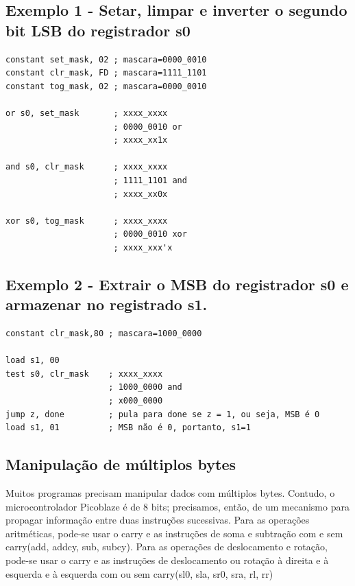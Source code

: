 \documentclass{article}
\begin{document}
\subsection{Exemplo 1 - Setar, limpar e inverter o segundo bit LSB do registrador s0}
\begin{boxedd}
\begin{lstlisting}
constant set_mask, 02 ; mascara=0000_0010
constant clr_mask, FD ; mascara=1111_1101
constant tog_mask, 02 ; mascara=0000_0010
 
or s0, set_mask       ; xxxx_xxxx
                      ; 0000_0010 or
                      ; xxxx_xx1x

and s0, clr_mask      ; xxxx_xxxx
                      ; 1111_1101 and
                      ; xxxx_xx0x 

xor s0, tog_mask      ; xxxx_xxxx 
                      ; 0000_0010 xor 
                      ; xxxx_xxx'x
\end{lstlisting}
\end{boxedd}
\subsection{Exemplo 2 - Extrair o MSB do registrador s0 e armazenar no registrado s1.}
\begin{boxedd}
\begin{lstlisting}
constant clr_mask,80 ; mascara=1000_0000

load s1, 00
test s0, clr_mask    ; xxxx_xxxx
                     ; 1000_0000 and
                     ; x000_0000
jump z, done         ; pula para done se z = 1, ou seja, MSB é 0
load s1, 01          ; MSB não é 0, portanto, s1=1          
\end{lstlisting}
\end{boxedd}
\subsection{Manipulação de múltiplos bytes}
Muitos programas precisam manipular dados com múltiplos bytes. Contudo, o microcontrolador Picoblaze é de 8 bits; precisamos, então, de um mecanismo para propagar informação entre duas instruções sucessivas.
  Para as operações aritméticas, pode-se usar o carry e as instruções de soma e subtração com e sem carry(add, addcy, sub, subcy).
  Para as operações de deslocamento e rotação, pode-se usar o carry e as instruções de deslocamento ou rotação à direita e à esquerda e à esquerda com ou sem carry(sl0, sla, sr0, sra, rl, rr)
\end{document}
